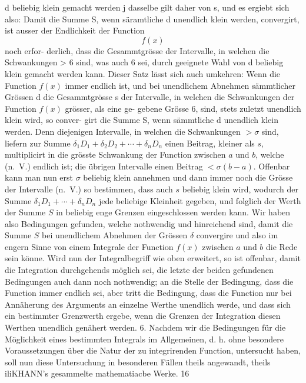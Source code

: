 \documentclass[11pt,a4paper]{article}
\begin{document}
{{%
d  beliebig  klein  gemacht   werden j  dasselbe  gilt  daher  von  s,  und  es
ergiebt  sich  also:
Damit  die  Summe  S,  wenn  säramtliche  d  unendlich  klein  werden,
convergirt,  ist  ausser  der  Endlichkeit  der  Function  $$f(x)$$  noch  erfor-
derlich, dass  die  Gesammtgrösse  der  Intervalle,  in  welchen  die
Schwankungen  >  6  sind,  was  auch  6  sei,  durch  geeignete  Wahl  von
d  beliebig  klein  gemacht  werden  kann.
Dieser  Satz  lässt  sich  auch  umkehren:
Wenn  die  Function  $f(x)$  immer  endlich  ist,  und  bei  unendlichem
Abnehmen  sämmtlicher  Grössen  d  die  Gesammtgrösse  s  der  Intervalle,
in  welchen  die  Schwankungen  der  Function  $f(x)$  grösser,  als  eine  ge-
gebene Grösse  6,  sind,  stets  zuletzt  unendlich  klein  wird,  so  conver-
girt  die  Summe  S,  wenn  sämmtliche  d  unendlich  klein  werden.
Denn  diejenigen  Intervalle,  in  welchen  die  Schwankungen  $> \sigma$
sind,  liefern  zur  Summe  $\delta_1 D_1 + \delta_2 D_2 + \cdots + \delta_n D_n$  einen  Beitrag,
kleiner  als  $s$,  multiplicirt  in  die  grösste  Schwankung  der  Function
zwischen  $a$  und  $b$,  welche  (n.~V.)  endlich  ist;  die  übrigen  Intervalle
einen  Beitrag  $< \sigma(b-a)$.  Offenbar  kann  man  nun  erst  $\sigma$  beliebig
klein  annehmen  und  dann  immer  noch  die  Grösse  der  Intervalle  (n.~V.)
so  bestimmen,  dass  auch  $s$  beliebig  klein  wird,  wodurch  der  Summe
$\delta_1 D_1 + \cdots + \delta_n D_n$  jede  beliebige  Kleinheit  gegeben,  und  folglich
der  Werth  der  Summe  $S$  in  beliebig  enge  Grenzen  eingeschlossen
werden  kann.
Wir  haben  also  Bedingungen  gefunden,  welche  nothwendig  und
hinreichend  sind,  damit  die  Summe  $S$  bei  unendlichem  Abnehmen  der
Grössen  $\delta$  convergire  und  also  im  engern  Sinne  von  einem  Integrale
der  Function  $f(x)$  zwischen  $a$  und  $b$  die  Rede  sein  könne.
Wird  nun  der  Integralbegriff  wie  oben  erweitert,  so  ist  offenbar,
damit  die  Integration  durchgehends  möglich  sei,  die  letzte  der  beiden
gefundenen  Bedingungen  auch  dann  noch  nothwendig;  an  die  Stelle
der  Bedingung,  dass  die  Function  immer  endlich  sei,  aber  tritt  die
Bedingung,  dass  die  Function  nur  bei  Annäherung  des  Arguments  an
einzelne  Werthe  unendlich  werde,  und  dass  sich  ein  bestimmter
Grenzwerth  ergebe,  wenn  die  Grenzen  der  Integration  diesen  Werthen
unendlich  genähert  werden.
6.
Nachdem  wir  die  Bedingungen  für  die  Möglichkeit  eines  bestimmten
Integrals  im  Allgemeinen,  d.  h.  ohne  besondere  Voraussetzungen  über
die  Natur  der  zu  integrirenden  Function,  untersucht  haben,  soll  nun
diese    Untersuchung    in    besonderen    Fällen    theils    angewandt,    theils
iliKHANN's  gesammelte  mathematiacbe  Werke.  16
\newpage

}}
\end{document}
